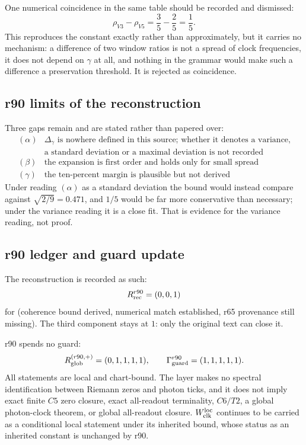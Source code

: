 One numerical coincidence in the same table should be recorded and dismissed:
\[
\rho_{V3}-\rho_{V5}=\frac35-\frac25=\frac15 .
\]
This reproduces the constant exactly rather than approximately, but it carries no mechanism:
a difference of two window ratios is not a spread of clock frequencies, it does not depend on
\(\gamma\) at all, and nothing in the grammar would make such a difference a preservation
threshold.  It is rejected as coincidence.

\subsection*{r90 limits of the reconstruction}
\label{subsec:r90-limits}

Three gaps remain and are stated rather than papered over:
\[
\begin{array}{c|l}
(\alpha) & \Delta_\gamma\text{ is nowhere defined in this source; whether it denotes a
 variance,}\\
 & \text{a standard deviation or a maximal deviation is not recorded}\\
(\beta) & \text{the expansion is first order and holds only for small spread}\\
(\gamma) & \text{the ten-percent margin is plausible but not derived}
\end{array}
\]
Under reading \((\alpha)\) as a standard deviation the bound would instead compare against
\(\sqrt{2/9}=0.471\), and \(1/5\) would be far more conservative than necessary; under the
variance reading it is a close fit.  That is evidence for the variance reading, not proof.

\subsection*{r90 ledger and guard update}
\label{subsec:r90-ledger-guard}

The reconstruction is recorded as such:
\[
R_{\rm rec}^{r90}=(0,0,1)
\]
for (coherence bound derived, numerical match established, r65 provenance still missing).
The third component stays at \(1\): only the original text can close it.

r90 spends no guard:
\[
R_{\rm glob}^{(r90,+)}=(0,1,1,1,1),
\qquad
\Gamma_{\rm guard}^{r90}=(1,1,1,1,1).
\]
All statements are local and chart-bound.  The layer makes no spectral identification between
Riemann zeros and photon ticks, and it does not imply exact finite \(C5\) zero closure, exact
all-readout terminality, \(C6/T2\), a global photon-clock theorem, or global all-readout
closure.  \(W_{\rm clk}^{\rm loc}\) continues to be carried as a conditional local statement
under its inherited bound, whose status as an inherited constant is unchanged by r90.


